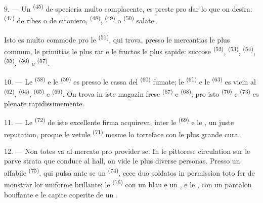 9. --- Un  \textsuperscript{(45)} de specieria multo complacente,
es preste pro dar lo que on desira:  \textsuperscript{(47)} de
ribes o de citoniero,  \textsuperscript{(48)},
 \textsuperscript{(49)} o 
\textsuperscript{(50)} salate.

Isto es multo commode pro le  \textsuperscript{(51)}, qui trova,
presso le mercantias le plus commun, le primitias le plus rar e le fructos le
plus sapide: succose  \textsuperscript{(52)}, 
\textsuperscript{(53)},  \textsuperscript{(54)}, 
\textsuperscript{(55)},  \textsuperscript{(56)} e
 \textsuperscript{(57)}.

\VUsaut{4.0mm}
\VUsaut{3.0mm}

10. --- Le  \textsuperscript{(58)} e le 
\textsuperscript{(59)} es presso le cassa del 
\textsuperscript{(60)} fumate; le  \textsuperscript{(61)} e le
 \textsuperscript{(63)} es vicin al 
\textsuperscript{(62)},  \textsuperscript{(64)},  \textsuperscript{(65)} e  \textsuperscript{(66)}. On trova
in iste magazin fresc  \textsuperscript{(67)} e 
\textsuperscript{(68)}; pro isto  \textsuperscript{(70)} e
 \textsuperscript{(73)} es plenate rapidissimemente.

11. --- Le  \textsuperscript{(72)} de iste excellente firma
acquireva, inter le  \textsuperscript{(69)} e le
, un juste reputation, proque le vetule 
\textsuperscript{(71)} mesme lo torreface con le plus grande cura.

\VUsaut{4.0mm}
\VUsaut{3.0mm}

12. --- Non totes va al mercato pro provider se. In le pittoresc circulation sur
le parve strata que conduce al hall, on vide le plus diverse personas. Presso un
affabile  \textsuperscript{(75)}, qui pulsa ante
se un  \textsuperscript{(74)}, ecce duo soldatos in
permission toto fer de monstrar lor uniforme brillante: le 
\textsuperscript{(76)} con un blau  e un , e le , con un pantalon bouffante e le capite
coperite de un .

